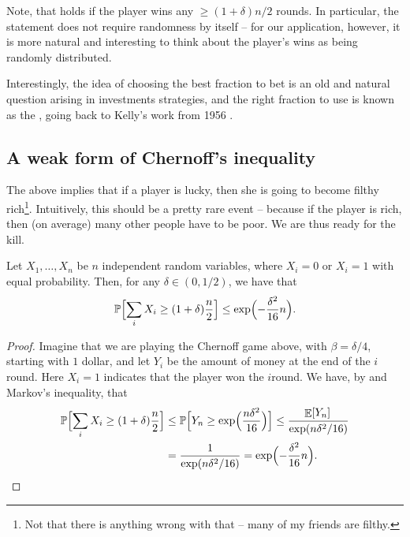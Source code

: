 \begin{remark}
    Note, that  holds if the player wins any
    $\geq (1+\delta)n/2$ rounds. In particular, the statement does not
    require randomness by itself -- for our application, however, it
    is more natural and interesting to think about the player's wins as
    being randomly distributed.
\end{remark}

\begin{remark}
    Interestingly, the idea of choosing the best fraction to bet is an
    old and natural question arising in investments strategies, and
    the right fraction to use is known as the
    \href{https://en.wikipedia.org/wiki/Kelly_criterion}{}, going back to Kelly's work from 1956
    \cite{k-niir-56}.
\end{remark}

\subsection{A  weak form of Chernoff's inequality}

The above implies that if a player is lucky, then she is going to
become filthy rich\footnote{Not that there is anything wrong with that
   -- many of my friends are filthy.}. Intuitively, this should be a
pretty rare event -- because if the player is rich, then (on average)
many other people have to be poor. We are thus ready for the kill.

\begin{theorem}
    Let $X_1,\ldots, X_n$ be $n$ independent random variables, where
    $X_i=0$ or $X_i=1$ with equal probability. Then, for any $\delta
    \in (0,1/2)$, we have that
    \begin{equation*}
        \ProbLTR \Bigl[ \sum_i X_i \geq (1+\delta)\frac{n}{2} \Bigr]%
        \leq%
        \exp\Bigl( -
        \frac{\delta^2}{ 16} n \Bigr).
    \end{equation*}
\end{theorem}
\begin{proof}
    Imagine that we are playing the Chernoff game above, with
    $\beta=\delta/4$, starting with $1$ dollar, and let $Y_i$ be the
    amount of money at the end of the $i$\th round.  Here $X_i=1$
    indicates that the player won the $i$\th round.  We have, by
     and Markov's inequality, that
    \begin{align*}
        \ProbLTR \Bigl[{ \sum_i X_i \geq (1+\delta)\frac{n}{2}} \Bigr]%
        &\leq %
        \ProbLTR \Bigl[{ Y_n \geq \exp \Bigl( {\frac{n \delta^2}{16}}
           \Bigr)
        } \Bigr] %
        \leq%
        \frac{\Ex{Y_n}\bigl. }{\bigl. \exp\pth{n \delta^2 / 16}}%
        \\&=%
        \frac{1}{\bigl.  \exp\pth{n \delta^2 / 16}} =
        \exp \Bigl( -\frac{\delta^2}{ 16} n  \Bigr).
    \end{align*}
\end{proof}

